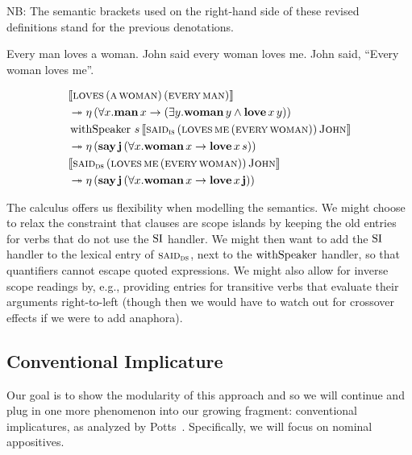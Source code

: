 \documentclass{llncs}
\newcommand{\negSpaceBetweenAlign}{\vspace{-8mm}}
\begin{document}
NB: The semantic brackets used on the right-hand side of these revised
definitions stand for the previous denotations.

\begin{exe}
  \ex Every man loves a woman.
  \ex John said every woman loves me.
  \ex John said, ``Every woman loves me''.
\end{exe}

\negSpaceBetweenAlign

\begin{align}
  & \llbracket \textsc{loves}\,(\textsc{a}\,\textsc{woman})\,(\textsc{every}\,\textsc{man}) \rrbracket \nonumber \\
  & \twoheadrightarrow \eta\,(\forall x. \textbf{man}\,x \to (\exists y. \textbf{woman}\,y \land \textbf{love}\,x\,y)) \\
  & \operatorname{withSpeaker}\,s\,\llbracket \textsc{said}_{\textsc{is}}\,(\textsc{loves}\,\textsc{me}\,(\textsc{every}\,\textsc{woman}))\,\textsc{John} \rrbracket \nonumber \\
  & \twoheadrightarrow \eta\,(\textbf{say}\,\textbf{j}\,(\forall x. \textbf{woman}\,x \to \textbf{love}\,x\,s)) \\
  & \llbracket \textsc{said}_{\textsc{ds}}\,(\textsc{loves}\,\textsc{me}\,(\textsc{every}\,\textsc{woman}))\,\textsc{John} \rrbracket \nonumber \\
  & \twoheadrightarrow \eta\,(\textbf{say}\,\textbf{j}\,(\forall x. \textbf{woman}\,x \to \textbf{love}\,x\,\textbf{j}))
\end{align}

The calculus offers us flexibility when modelling the semantics. We might
choose to relax the constraint that clauses are scope islands by keeping
the old entries for verbs that do not use the $\operatorname{SI}$ handler. We might then
want to add the $\operatorname{SI}$ handler to the lexical entry of
$\textsc{said}_{\textsc{ds}}$, next to the $\operatorname{withSpeaker}$ handler, so that
quantifiers cannot escape quoted expressions. We might also allow for
inverse scope readings by, e.g., providing entries for transitive verbs
that evaluate their arguments right-to-left (though then we would have to
watch out for crossover effects if we were to add anaphora).

\subsection{Conventional Implicature}
\label{ssec:ci}

Our goal is to show the modularity of this approach and so we will continue
and plug in one more phenomenon into our growing fragment: conventional
implicatures, as analyzed by Potts~\cite{potts2005logic}. Specifically, we
will focus on nominal appositives.
\end{document}
